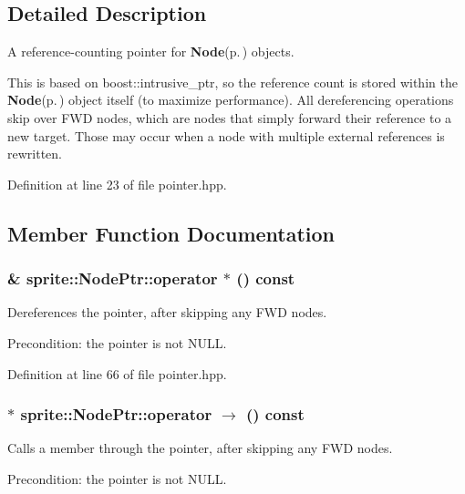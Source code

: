 \subsection{Detailed Description}
A reference-counting pointer for {\bf Node}{\rm (p.\,\pageref{structsprite_1_1Node})} objects. 

This is based on boost::intrusive\_\-ptr, so the reference count is stored within the {\bf Node}{\rm (p.\,\pageref{structsprite_1_1Node})} object itself (to maximize performance). All dereferencing operations skip over FWD nodes, which are nodes that simply forward their reference to a new target. Those may occur when a node with multiple external references is rewritten. 



Definition at line 23 of file pointer.hpp.

\subsection{Member Function Documentation}
\subsubsection{\& sprite::Node\-Ptr::operator $\ast$ () const\hspace{0.3cm}{\tt  [inline]}}\label{structsprite_1_1NodePtr_a4}


Dereferences the pointer, after skipping any FWD nodes. 

Precondition: the pointer is not NULL. 

Definition at line 66 of file pointer.hpp.
\subsubsection{$\ast$ sprite::Node\-Ptr::operator $\rightarrow$  () const\hspace{0.3cm}{\tt  [inline]}}\label{structsprite_1_1NodePtr_a5}


Calls a member through the pointer, after skipping any FWD nodes. 

Precondition: the pointer is not NULL. 

